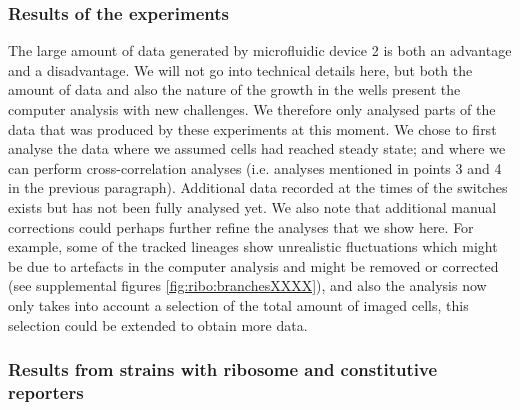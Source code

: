 \subsubsection{Results of the experiments}

The large amount of data generated by microfluidic device 2 is both an advantage and a disadvantage.
%
We will not go into technical details here, but both the amount of data and also the nature of the growth in the wells present the computer analysis with new challenges.
%
We therefore only analysed parts of the data that was produced by these experiments at this moment.
%
We chose to first analyse the data where we assumed cells had reached steady state; and where we can perform cross-correlation analyses (i.e. analyses mentioned in points 3 and 4 in the previous paragraph).
Additional data recorded at the times of the switches exists but has not been fully analysed yet.
%
We also note that 
additional manual corrections 
could perhaps further refine the analyses that we show here. 
%
For example, some of the tracked lineages show unrealistic fluctuations which might be due to artefacts in the computer analysis and might be removed or corrected (see supplemental figures \ref{fig:ribo:branchesXXXX}), and also the analysis now only takes into account a selection of the total amount of imaged cells, this selection could be extended to obtain more data.

\subsubsection{Results from strains with ribosome and constitutive reporters}

